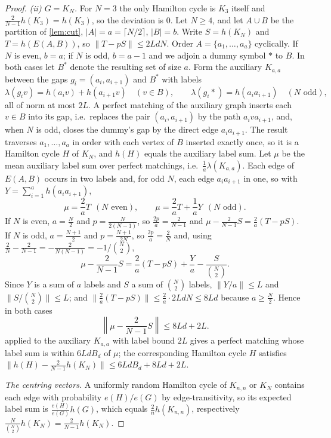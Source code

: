 \documentclass[11pt,a4paper]{article}
\theoremstyle{plain}
\theoremstyle{definition}
\theoremstyle{remark}
\newcommand{\norm}[1]{\left\|#1\right\|}
\begin{document}
\begin{proof}
\emph{(ii) $G=K_N$.} For $N=3$ the only Hamilton cycle is $K_3$ itself and $\frac2{N-1}h(K_3)=h(K_3)$, so the deviation is $0$. Let $N\ge4$, and let $A\cup B$ be the partition of \cref{lem:cut}, $|A|=a=\lceil N/2\rceil$, $|B|=b$. Write $S=h(K_N)$ and $T=h(E(A,B))$, so $\|T-pS\|\le2LdN$. Order $A=\{a_1,\dots,a_a\}$ cyclically. If $N$ is even, $b=a$; if $N$ is odd, $b=a-1$ and we adjoin a dummy symbol $\ast$ to $B$. In both cases let $B^\ast$ denote the resulting set of size $a$. Form the auxiliary $K_{a,a}$ between the gaps $g_i=(a_i,a_{i+1})$ and $B^\ast$ with labels
\[
 \lambda(g_iv)=h(a_iv)+h(a_{i+1}v)\quad(v\in B),\qquad \lambda(g_i\ast)=h(a_ia_{i+1})\quad(N\text{ odd}),
\]
all of norm at most $2L$. A perfect matching of the auxiliary graph inserts each $v\in B$ into its gap, i.e.\ replaces the pair $(a_i,a_{i+1})$ by the path $a_iva_{i+1}$, and, when $N$ is odd, closes the dummy's gap by the direct edge $a_ia_{i+1}$. The result traverses $a_1,\dots,a_a$ in order with each vertex of $B$ inserted exactly once, so it is a Hamilton cycle $H$ of $K_N$, and $h(H)$ equals the auxiliary label sum. Let $\mu$ be the mean auxiliary label sum over perfect matchings, i.e.\ $\frac1a\lambda(K_{a,a})$. Each edge of $E(A,B)$ occurs in two labels and, for odd $N$, each edge $a_ia_{i+1}$ in one, so with $Y=\sum_{i=1}^ah(a_ia_{i+1})$,
\[
 \mu=\frac2aT\ \ (N\text{ even}),\qquad \mu=\frac2aT+\frac1aY\ \ (N\text{ odd}).
\]
If $N$ is even, $a=\frac N2$ and $p=\frac{N}{2(N-1)}$, so $\frac{2p}a=\frac2{N-1}$ and $\mu-\frac2{N-1}S=\frac2a(T-pS)$. If $N$ is odd, $a=\frac{N+1}2$ and $p=\frac{N+1}{2N}$, so $\frac{2p}a=\frac2N$ and, using $\frac2N-\frac2{N-1}=-\frac2{N(N-1)}=-1/\binom N2$,
\[
 \mu-\frac2{N-1}S=\frac2a(T-pS)+\frac Ya-\frac{S}{\binom N2} .
\]
Since $Y$ is a sum of $a$ labels and $S$ a sum of $\binom N2$ labels, $\|Y/a\|\le L$ and $\|S/\binom N2\|\le L$; and $\|\frac2a(T-pS)\|\le\frac2a\cdot2LdN\le8Ld$ because $a\ge\frac N2$. Hence in both cases
\[
 \norm{\mu-\frac2{N-1}S}\le8Ld+2L .
\]
 applied to the auxiliary $K_{a,a}$ with label bound $2L$ gives a perfect matching whose label sum is within $6LdB_d$ of $\mu$; the corresponding Hamilton cycle $H$ satisfies $\|h(H)-\frac2{N-1}h(K_N)\|\le6LdB_d+8Ld+2L$.

\emph{The centring vectors.} A uniformly random Hamilton cycle of $K_{n,n}$ or $K_N$ contains each edge with probability $e(H)/e(G)$ by edge-transitivity, so its expected label sum is $\frac{e(H)}{e(G)}h(G)$, which equals $\frac2nh(K_{n,n})$, respectively $\frac{N}{\binom N2}h(K_N)=\frac2{N-1}h(K_N)$.
\end{proof}
\end{document}
